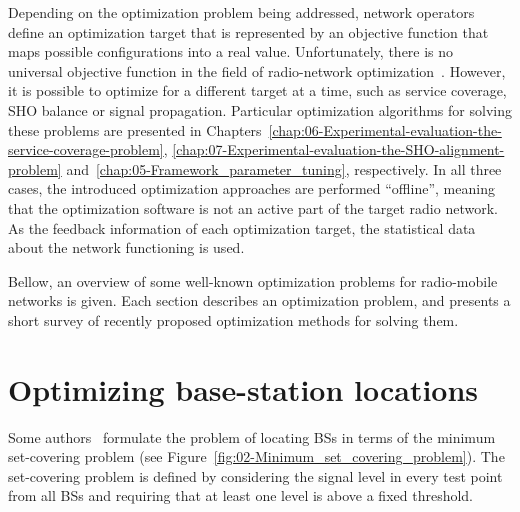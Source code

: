 Depending on the optimization problem being addressed, network operators
define an optimization target that is represented by an objective
function that maps possible configurations into a real value. Unfortunately,
there is no universal objective function in the field of radio-network
optimization~\cite{Nawrocki-Understanding_UMTS_radio_network_modelling_and_optimisation:2006}.
However, it is possible to optimize for a different target at a time,
such as service coverage, SHO balance or signal propagation. Particular
optimization algorithms for solving these problems are presented in
Chapters~\ref{chap:06-Experimental-evaluation-the-service-coverage-problem},
\ref{chap:07-Experimental-evaluation-the-SHO-alignment-problem} and~\ref{chap:05-Framework_parameter_tuning},
respectively. In all three cases, the introduced optimization approaches
are performed ``offline'', meaning that the optimization software
is not an active part of the target radio network. As the feedback
information of each optimization target, the statistical data about
the network functioning is used.

\bigskip{}


Bellow, an overview of some well-known optimization problems for radio-mobile
networks is given. Each section describes an optimization problem,
and presents a short survey of recently proposed optimization methods
for solving them.


\section{Optimizing base-station locations}

Some authors~\cite{minimum.set.covering.problem:1997,minimum.set.covering.problem:2000}
formulate the problem of locating BSs in terms of the minimum set-covering
problem (see Figure~\ref{fig:02-Minimum_set_covering_problem}).
The set-covering problem is defined by considering the signal level
in every test point from all BSs and requiring that at least one level
is above a fixed threshold.

